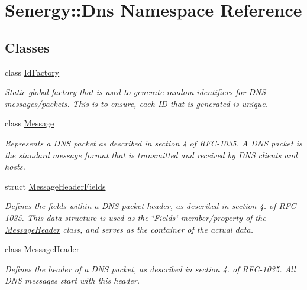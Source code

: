 \hypertarget{namespace_senergy_1_1_dns}{\section{Senergy\-:\-:Dns Namespace Reference}
\label{namespace_senergy_1_1_dns}
}
\subsection*{Classes}
\begin{DoxyCompactItemize}
\item 
class \hyperlink{class_senergy_1_1_dns_1_1_id_factory}{Id\-Factory}
\begin{DoxyCompactList}\small\item\em Static global factory that is used to generate random identifiers for D\-N\-S messages/packets. This is to ensure, each I\-D that is generated is unique. \end{DoxyCompactList}\item 
class \hyperlink{class_senergy_1_1_dns_1_1_message}{Message}
\begin{DoxyCompactList}\small\item\em Represents a D\-N\-S packet as described in section 4 of R\-F\-C-\/1035. A D\-N\-S packet is the standard message format that is transmitted and received by D\-N\-S clients and hosts. \end{DoxyCompactList}\item 
struct \hyperlink{struct_senergy_1_1_dns_1_1_message_header_fields}{Message\-Header\-Fields}
\begin{DoxyCompactList}\small\item\em Defines the fields within a D\-N\-S packet header, as described in section 4. of R\-F\-C-\/1035. This data structure is used as the \char`\"{}\-Fields\char`\"{} member/property of the \hyperlink{class_senergy_1_1_dns_1_1_message_header}{Message\-Header} class, and serves as the container of the actual data. \end{DoxyCompactList}\item 
class \hyperlink{class_senergy_1_1_dns_1_1_message_header}{Message\-Header}
\begin{DoxyCompactList}\small\item\em Defines the header of a D\-N\-S packet, as described in section 4. of R\-F\-C-\/1035. All D\-N\-S messages start with this header. \end{DoxyCompactList}\item 

\end{DoxyCompactItemize}
